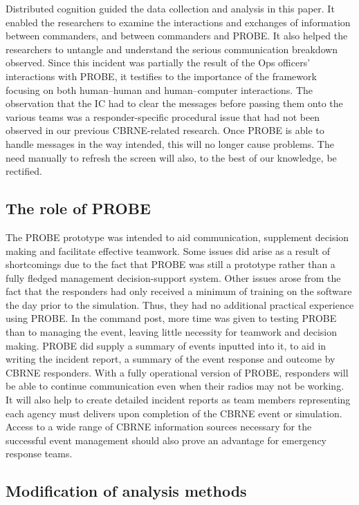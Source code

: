 \documentclass[link]{IWCOMP}
\begin{document}
 Distributed cognition guided the data collection and analysis in this paper.
It enabled the researchers to examine the interactions and exchanges of
information between commanders, and between commanders and PROBE. It also
helped the researchers to untangle and understand the serious communication
breakdown observed. Since this incident was partially the result of the Ops
officers' interactions with PROBE, it testifies to the importance of the
framework focusing on both human--human and human--computer interactions.
The observation that the IC had to clear the messages before passing them
onto the various teams was a responder-specific procedural issue that had
not been observed in our previous CBRNE-related research. Once PROBE is able
to handle messages in the way intended, this will no longer cause problems.
The need manually to refresh the screen will also, to the best of our
knowledge, be rectified.

\subsection{The role of PROBE}\label{subsec5.2}

The PROBE prototype was intended to aid communication, supplement decision
making and facilitate effective teamwork. Some issues did arise as a result
of shortcomings due to the fact that PROBE was still a prototype rather than
a fully fledged management decision-support system. Other issues arose from
the fact that the responders had only received a minimum of training on the
software the day prior to the simulation. Thus, they had no additional
practical experience using PROBE. In the command post, more time was given
to testing PROBE than to managing the event, leaving little necessity for
teamwork and decision making. PROBE did supply a summary of events inputted
into it, to aid in writing the incident report, a summary of the event
response and outcome by CBRNE responders. With a fully operational version
of PROBE, responders will be able to continue communication even when their
radios may not be working. It will also help to create detailed incident
reports as team members representing each agency must delivers upon
completion of the CBRNE event or simulation. Access to a wide range of CBRNE
information sources necessary for the successful event management should
also prove an advantage for emergency response teams.

\subsection{Modification of analysis methods}\label{subsec5.3}
\end{document}
